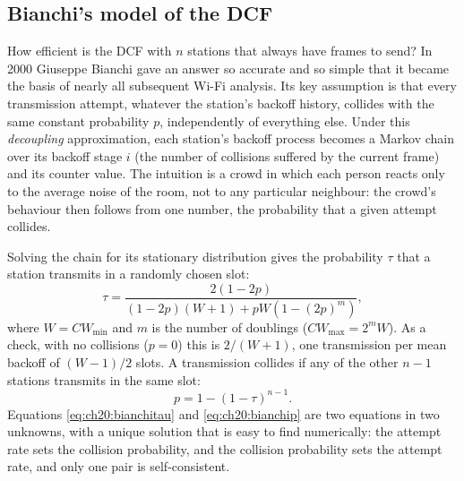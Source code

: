 \subsection{Bianchi's model of the DCF}

How efficient is the DCF with $n$ stations that always have frames to send? In 2000 Giuseppe Bianchi gave
an answer so accurate and so simple that it became the basis of nearly all subsequent Wi-Fi analysis. Its
key assumption is that every transmission attempt, whatever the station's backoff history, collides with the
same constant probability $p$, independently of everything else. Under this \emph{decoupling} approximation,
each station's backoff process becomes a Markov chain over its backoff stage $i$ (the number of
collisions suffered by the current frame) and its counter value. The intuition is a crowd in which
each person reacts only to the average noise of the room, not to any particular neighbour: the
crowd's behaviour then follows from one number, the probability that a given attempt collides.


Solving the chain for its stationary distribution gives the probability $\tau$ that a station transmits
in a randomly chosen slot:
\begin{equation}
\tau=\frac{2(1-2p)}{(1-2p)(W+1)+pW\left(1-(2p)^m\right)},
\label{eq:ch20:bianchitau}
\end{equation}
where $W=CW_{\min}$ and $m$ is the number of doublings ($CW_{\max}=2^mW$). As a check, with no collisions
($p=0$) this is $2/(W+1)$, one transmission per mean backoff of $(W-1)/2$ slots. A transmission collides if
any of the other $n-1$ stations transmits in the same slot:
\begin{equation}
p=1-(1-\tau)^{n-1}.
\label{eq:ch20:bianchip}
\end{equation}
Equations \eqref{eq:ch20:bianchitau} and \eqref{eq:ch20:bianchip} are two equations in two unknowns, with a
unique solution that is easy to find numerically: the attempt rate sets the collision probability, and the
collision probability sets the attempt rate, and only one pair is self-consistent.


